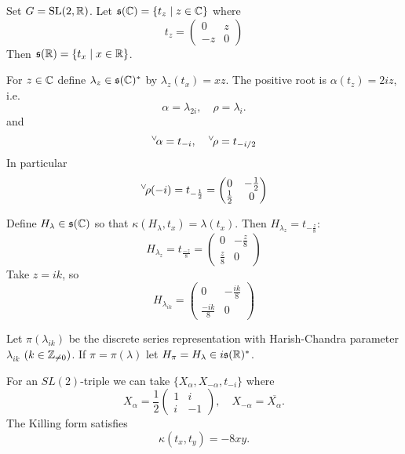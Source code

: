 \documentclass{article}
\theoremstyle{definition}
\numberwithin{equation}{section}
\renewcommand{\-}{\hyp{}}
\newcommand{\s}{\mathfrak s}
\newcommand{\SL}{\mathrm{SL}}
\newcommand{\ch}[1]{\negthinspace\negthinspace\negthinspace\phantom{a}^\vee\negthinspace #1}
\begin{document}
Set $G=\SL(2,\R)$. Let $\s(\C)=\{t_z\mid z\in\C\}$ where
$$
t_z=\begin{pmatrix}0&z\\-z&0
\end{pmatrix}
$$
Then $\s(\R)=\{t_x\mid x\in\R\}$.

For $z\in \mathbb{C}$ define $\lambda_z\in \s(\C)^*$ by $\lambda_z(t_x)=xz$.
The positive root is  $\alpha(t_z)=2iz$, i.e.
$$
\alpha=\lambda_{2i},\quad \rho=\lambda_i.
$$
and
$$
\ch\alpha=t_{-i}, \quad \ch\rho=t_{-i/2}
$$
In particular
$$
\ch\rho(-i)=t_{-\frac 12}=\begin{pmatrix}0&-\frac 12\\\frac 12&0
\end{pmatrix}
$$

Define $H_{\lambda}\in \s(\C)$ so that $\kappa(H_\lambda,t_x)=\lambda(t_x)$. Then $H_{\lambda_z}=t_{-\frac z8}$:
$$
H_{\lambda_z}=t_{\frac{-z}8}=
\begin{pmatrix}0&-\frac{z}8\\\frac{z}8&0
\end{pmatrix}
$$
Take $z=ik$, so
$$
H_{\lambda_{ik}}=
\begin{pmatrix}0&-\frac{ik}8\\\frac{-ik}8&0
\end{pmatrix}
$$

Let $\pi(\lambda_{ik})$ be the discrete series representation with Harish-Chandra parameter $\lambda_{ik}$ $(k\in \mathbb{Z}_{\ne 0})$.
If $\pi=\pi(\lambda)$ let $H_\pi=H_\lambda\in i\s(\R)^*$.

For an $SL(2)$-triple we can take $\{X_\alpha,X_{-\alpha},t_{-i}\}$ where
$$
X_\alpha=\frac12\begin{pmatrix}1&i\\i&-1
\end{pmatrix}, \quad X_{-\alpha}=\overline{X_\alpha}.
$$
The Killing form satisfies
$$
\kappa(t_x,t_y)=-8xy.
$$
\end{document}
